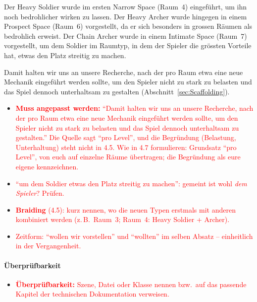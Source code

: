 \documentclass[../Main.tex]{subfiles}
\begin{document}
Der Heavy Soldier wurde im ersten Narrow Space (Raum~4) eingeführt, um ihn noch bedrohlicher wirken zu lassen. Der Heavy Archer wurde hingegen in einem Prospect Space (Raum~6) vorgestellt, da er sich besonders in grossen Räumen als bedrohlich erweist. Der Chain Archer wurde in einem Intimate Space (Raum~7) vorgestellt, um dem Soldier im Raumtyp, in dem der Spieler die grössten Vorteile hat, etwas den Platz streitig zu machen.

Damit halten wir uns an unsere Recherche, nach der pro Raum etwa eine neue Mechanik eingeführt werden sollte, um den Spieler nicht zu stark zu belasten und das Spiel dennoch unterhaltsam zu gestalten (Abschnitt~\ref{sec:Scaffolding}).

\begin{itemize}[leftmargin=1.5cm]
    \item \textcolor{red}{\textbf{Muss angepasst werden:} \enquote{Damit halten wir uns an unsere Recherche, nach der pro Raum etwa eine neue Mechanik eingeführt werden sollte, um den Spieler nicht zu stark zu belasten und das Spiel dennoch unterhaltsam zu gestalten.} Die Quelle sagt \enquote{pro Level}, und die Begründung (Belastung, Unterhaltung) steht nicht in 4.5. Wie in 4.7 formulieren: Grundsatz \enquote{pro Level}, von euch auf einzelne Räume übertragen; die Begründung als eure eigene kennzeichnen.}
    \item \textcolor{red}{\enquote{um dem Soldier etwas den Platz streitig zu machen}: gemeint ist wohl \emph{dem Spieler}? Prüfen.}
    \item \textcolor{red}{\textbf{Braiding} (4.5): kurz nennen, wo die neuen Typen erstmals mit anderen kombiniert werden (z.\,B.\ Raum~3; Raum~4: Heavy Soldier + Archer).}
    \item \textcolor{red}{Zeitform: \enquote{wollen wir vorstellen} und \enquote{wollten} im selben Absatz -- einheitlich in der Vergangenheit.}
\end{itemize}

\paragraph{Überprüfbarkeit}
\begin{itemize}[leftmargin=1.5cm]
    \item \textcolor{red}{\textbf{Überprüfbarkeit:} Szene, Datei oder Klasse nennen bzw.\ auf das passende Kapitel der technischen Dokumentation verweisen.}
\end{itemize}
\end{document}
